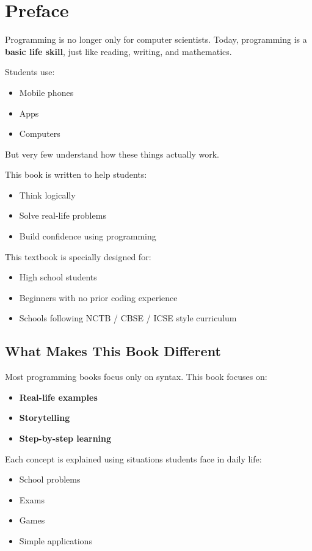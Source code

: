 \chapter*{Preface}

Programming is no longer only for computer scientists.
Today, programming is a \textbf{basic life skill}, just like reading, writing, and mathematics.

Students use:
\begin{itemize}
    \item Mobile phones
    \item Apps
    \item Computers
\end{itemize}

But very few understand how these things actually work.

This book is written to help students:
\begin{itemize}
    \item Think logically
    \item Solve real-life problems
    \item Build confidence using programming
\end{itemize}

This textbook is specially designed for:
\begin{itemize}
    \item High school students
    \item Beginners with no prior coding experience
    \item Schools following NCTB / CBSE / ICSE style curriculum
\end{itemize}

\section*{What Makes This Book Different}

Most programming books focus only on syntax.
This book focuses on:
\begin{itemize}
    \item \textbf{Real-life examples}
    \item \textbf{Storytelling}
    \item \textbf{Step-by-step learning}
\end{itemize}

Each concept is explained using situations students face in daily life:
\begin{itemize}
    \item School problems
    \item Exams
    \item Games
    \item Simple applications
\end{itemize}


